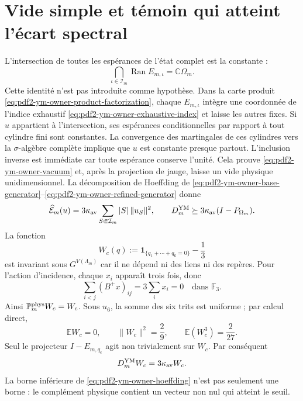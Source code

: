 \section{Vide simple et témoin qui atteint l'écart spectral}

L'intersection de toutes les espérances de l'état complet est la constante :
\begin{equation}\label{eq:pdf2-ym-owner-vacuum}
 \bigcap_{\iota\in\mathcal I_m}\operatorname{Ran}E_{m,\iota}
 =\mathbb C\Omega_m.
\end{equation}
Cette identité n'est pas introduite comme hypothèse. Dans la carte produit \eqref{eq:pdf2-ym-owner-product-factorization}, chaque $E_{m,\iota}$ intègre une coordonnée de l'indice exhaustif \eqref{eq:pdf2-ym-owner-exhaustive-index} et laisse les autres fixes. Si $u$ appartient à l'intersection, ses espérances conditionnelles par rapport à tout cylindre fini sont constantes. La convergence des martingales de ces cylindres vers la $\sigma$-algèbre complète implique que $u$ est constante presque partout. L'inclusion inverse est immédiate car toute espérance conserve l'unité. Cela prouve \eqref{eq:pdf2-ym-owner-vacuum} et, après la projection de jauge, laisse un vide physique unidimensionnel.
La décomposition de Hoeffding de \eqref{eq:pdf2-ym-owner-base-generator}--\eqref{eq:pdf2-ym-owner-refined-generator} donne
\begin{equation}\label{eq:pdf2-ym-owner-hoeffding}
 \widehat{\mathcal E}_m(u)
 =3\kappa_{\rm av}\sum_{S\Subset\mathcal I_m}|S|\,\|u_S\|^2,
 \qquad
 D_m^{\rm YM}\succeq
 3\kappa_{\rm av}(I-P_{\Omega_m}).
\end{equation}
La fonction
\begin{equation}\label{eq:pdf2-ym-owner-wc}
 W_c(q):=\mathbf1_{\{q_1+\cdots+q_6=0\}}-\frac13
\end{equation}
est invariant sous $G^{V(\Lambda_m)}$ car il ne dépend ni des liens ni des repères. Pour
l’action d’incidence, chaque $x_i$ apparaît trois fois, donc
\begin{equation}\label{eq:pdf2-ym-owner-wc-invariance}
 \sum_{i<j}(B^+x)_{ij}=3\sum_i x_i=0
 \quad\text{dans }\mathbb F_3.
\end{equation}
Ainsi $\mathbb P_m^{\rm phys}W_c=W_c$. Sous $u_6$, la somme des six trits est
uniforme ; par calcul direct,
\begin{equation}\label{eq:pdf2-ym-owner-wc-moments}
 \mathbb EW_c=0,\qquad
 \|W_c\|^2=\frac29,\qquad
 \mathbb E(W_c^3)=\frac2{27}.
\end{equation}
Seul le projecteur $I-E_{m,q_c}$ agit non trivialement sur $W_c$. Par conséquent
\begin{equation}\label{eq:pdf2-ym-owner-wc-eigenvalue}
 D_m^{\rm YM}W_c=3\kappa_{\rm av}W_c.
\end{equation}
La borne inférieure de \eqref{eq:pdf2-ym-owner-hoeffding} n’est pas seulement une borne : le
complément physique contient un vecteur non nul qui atteint le seuil.

